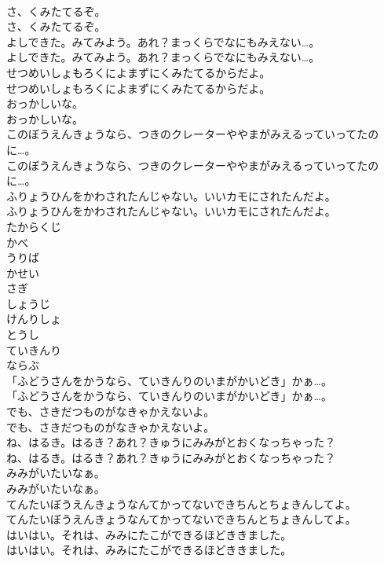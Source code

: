 \documentclass[8pt]{extreport}
\begin{document}
\begin{CJK}{UTF8}{min}
\\	さ、くみたてるぞ。
\\	さ、くみたてるぞ。
\\	よしできた。みてみよう。あれ？まっくらでなにもみえない…。
\\	よしできた。みてみよう。あれ？まっくらでなにもみえない…。
\\	せつめいしょもろくによまずにくみたてるからだよ。
\\	せつめいしょもろくによまずにくみたてるからだよ。
\\	おっかしいな。
\\	おっかしいな。
\\	このぼうえんきょうなら、つきのクレーターややまがみえるっていってたのに…。
\\	このぼうえんきょうなら、つきのクレーターややまがみえるっていってたのに…。
\\	ふりょうひんをかわされたんじゃない。いいカモにされたんだよ。
\\	ふりょうひんをかわされたんじゃない。いいカモにされたんだよ。
\\	たからくじ
\\	かべ
\\	うりば
\\	かせい
\\	さぎ
\\	しょうじ
\\	けんりしょ
\\	とうし
\\	ていきんり
\\	ならぶ
\\	「ふどうさんをかうなら、ていきんりのいまがかいどき」かぁ…。
\\	「ふどうさんをかうなら、ていきんりのいまがかいどき」かぁ…。
\\	でも、さきだつものがなきゃかえないよ。
\\	でも、さきだつものがなきゃかえないよ。
\\	ね、はるき。はるき？あれ？きゅうにみみがとおくなっちゃった？
\\	ね、はるき。はるき？あれ？きゅうにみみがとおくなっちゃった？
\\	みみがいたいなぁ。
\\	みみがいたいなぁ。
\\	てんたいぼうえんきょうなんてかってないできちんとちょきんしてよ。
\\	てんたいぼうえんきょうなんてかってないできちんとちょきんしてよ。
\\	はいはい。それは、みみにたこができるほどききました。
\\	はいはい。それは、みみにたこができるほどききました。

\end{CJK}
\end{document}
